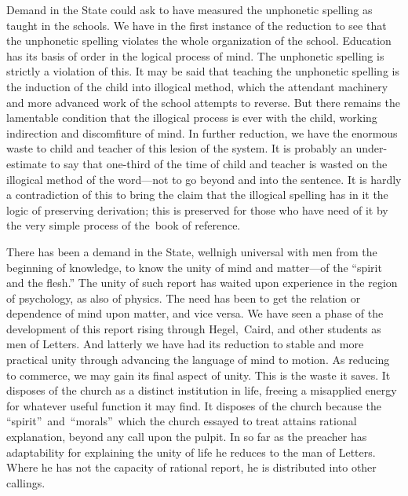 \documentclass[twoside,symmetric,nobib,justified]{tufte-book}
\begin{document}
Demand in the State could ask to have measured the unphonetic spelling
as taught in the schools. We have in the first instance of the reduction
to see that the unphonetic spelling violates the whole organization of
the school. Education has its basis of order in the logical process of
mind. The unphonetic spelling is strictly a violation of this. It may be
said that teaching the unphonetic spelling is the induction of the child
into illogical method, which the attendant machinery and more advanced
work of the school attempts to reverse. But there remains the lamentable
condition that the illogical process is ever with the child, working
indirection and discomfiture of mind. In further reduction, we have the
enormous waste to child and teacher of this lesion of the system. It is
probably an under-estimate to say that one-third of the time of child
and teacher is wasted on the illogical method of the word---not to go
beyond and into the sentence. It is hardly a contradiction of this to
bring the claim that the illogical spelling has in it the logic of
preserving derivation; this is preserved for those who have need of it
by the very simple process of the~book of reference.~

There has been a demand in the State, wellnigh universal with men from
the beginning of knowledge, to know the unity of mind and matter---of
the ``spirit and the flesh.'' The unity of such report has waited upon
experience in the region of psychology, as also of physics. The need has
been to get the relation or dependence of mind upon matter, and vice
versa. We have seen a phase of the development of this report rising
through Hegel,~Caird, and other students as men of Letters. And latterly
we have had its reduction to stable and more practical unity through
advancing the language of mind to motion. As reducing to commerce, we
may gain its final aspect of unity. This is the waste it saves. It
disposes of the church as a distinct institution in life, freeing a
misapplied energy for whatever useful function it may find. It disposes
of the church because the ``spirit''~and~``morals''~which the church
essayed to treat attains rational explanation, beyond any call upon the
pulpit. In so far as the preacher has adaptability for explaining the
unity of life he reduces to the man of Letters. Where he has not the
capacity of rational report, he is distributed into other callings.~

\vspace{0.05in}
\end{document}
